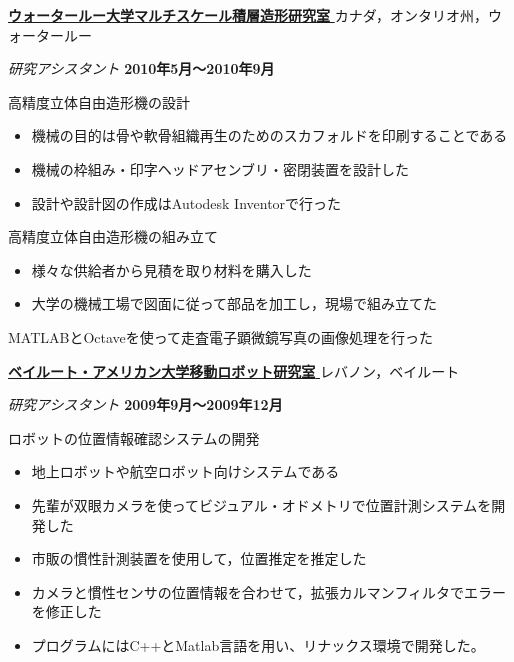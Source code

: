 \documentclass[10pt, a4paper]{article}
\def\xeCJKembold{0.15}
\def\saveCJKnode{\dimen255\lastkern}
\def\restoreCJKnode{\kern-\dimen255\kern\dimen255}
\let\CJKoldsymbol\CJKsymbol
\let\CJKoldpunctsymbol\CJKpunctsymbol
\def\CJKfakeboldsymbol#1{%
\special{pdf:literal direct 2 Tr \xeCJKembold\space w}%
\CJKoldsymbol{#1}%
\saveCJKnode
\special{pdf:literal direct 0 Tr}%
\restoreCJKnode}
\def\CJKfakeboldpunctsymbol#1{%
\special{pdf:literal direct 2 Tr \xeCJKembold\space w}%
\CJKoldpunctsymbol{#1}%
\saveCJKnode
\special{pdf:literal direct 0 Tr}%
\restoreCJKnode}
\newcommand\CJKfakebold[1]{%
\let\CJKsymbol\CJKfakeboldsymbol
\let\CJKpunctsymbol\CJKfakeboldpunctsymbol
#1%
\let\CJKsymbol\CJKoldsymbol
\let\CJKpunctsymbol\CJKoldpunctsymbol}
\begin{document}
\halfblankline

\href{http://rpl.uwaterloo.ca/}{\CJKfakebold{\textbf{ウォータールー大学マルチスケール積層造形研究室}}}\hfill カナダ，オンタリオ州，ウォータールー

\begin{outerlist}
\item[] \textit{研究アシスタント} \hfill \textbf{2010年5月〜2010年9月}
  \begin{innerlist}
  \item 高精度立体自由造形機の設計
    \begin{itemize}
      \item 機械の目的は骨や軟骨組織再生のためのスカフォルドを印刷することである
      \item 機械の枠組み・印字ヘッドアセンブリ・密閉装置を設計した
      \item 設計や設計図の作成はAutodesk Inventorで行った
    \end{itemize}
  \item 高精度立体自由造形機の組み立て
    \begin{itemize}
      \item 様々な供給者から見積を取り材料を購入した
      \item 大学の機械工場で図面に従って部品を加工し，現場で組み立てた
    \end{itemize}
  \item MATLABとOctaveを使って走査電子顕微鏡写真の画像処理を行った
  \end{innerlist}
\end{outerlist}

\halfblankline

\href{http://www.aub.edu.lb/fea/me/research_labs/cvl/Pages/home.aspx}{\CJKfakebold{\textbf{ベイルート・アメリカン大学移動ロボット研究室}}}\hfill レバノン，ベイルート

\begin{outerlist}
\item[] \textit{研究アシスタント} \hfill \textbf{2009年9月〜2009年12月}
  \begin{innerlist}
  \item ロボットの位置情報確認システムの開発
    \begin{itemize}
      \item 地上ロボットや航空ロボット向けシステムである
      \item 先輩が双眼カメラを使ってビジュアル・オドメトリで位置計測システムを開発した
      \item 市販の慣性計測装置を使用して，位置推定を推定した
      \item カメラと慣性センサの位置情報を合わせて，拡張カルマンフィルタでエラーを修正した
      \item プログラムにはC++とMatlab言語を用い、リナックス環境で開発した。
    \end{itemize}
  \end{innerlist}
\end{outerlist}
\end{document}
